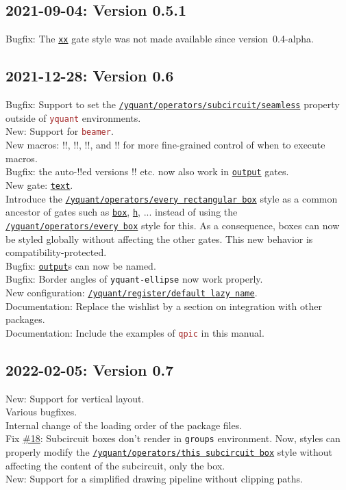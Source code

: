\documentclass{scrartcl}
\def\pkg#1{\textcolor{brown}{\texttt{#1}}}
\def\gate#1{\hyperref[gate:#1]{\texttt{#1}}}
\def\style#1{\hyperref[style:#1]{\texttt{#1}}}
\def\Yquant{\pkg{yquant}}
\begin{document}
      \subsection*{2021-09-04: Version 0.5.1}
         Bugfix: The \gate{xx} gate style was not made available since version~0.4-alpha.

      \subsection*{2021-12-28: Version 0.6}
         Bugfix: Support to set the \style{/yquant/operators/subcircuit/seamless} property outside of \Yquant{} environments. \\
         New: Support for \pkg{beamer}. \\
         New macros: \tex!\yquantsecondpass!, \tex!\yquantesecondpass!, \tex!\yquantescape!, and \tex!\yquanteescape! for more fine\hyp grained control of when to execute macros. \\
         Bugfix: the auto\hyp\tex!\protect!ed versions \tex!\Ifnum! etc. now also work in \gate{output} gates. \\
         New gate: \gate{text}. \\
         Introduce the \style{/yquant/operators/every rectangular box} style as a common ancestor of gates such as \gate{box}, \gate{h}, ... instead of using the \style{/yquant/operators/every box} style for this.
         As a consequence, boxes can now be styled globally without affecting the other gates.
         This new behavior is compatibility\hyp protected. \\
         Bugfix: \gate{output}s can now be named. \\
         Bugfix: Border angles of \texttt{yquant-ellipse} now work properly. \\
         New configuration: \style{/yquant/register/default lazy name}. \\
         Documentation: Replace the wishlist by a section on integration with other packages. \\
         Documentation: Include the examples of \pkg{qpic} in this manual.

      \subsection*{2022-02-05: Version 0.7}
         New: Support for vertical layout. \\
         Various bugfixes. \\
         Internal change of the loading order of the package files. \\
         Fix \href{https://github.com/projekter/yquant/issues/18}{\#18}: Subcircuit boxes don't render in \texttt{groups} environment.
         Now, styles can properly modify the \style{/yquant/operators/this subcircuit box} style without affecting the content of the subcircuit, only the box. \\
         New: Support for a simplified drawing pipeline without clipping paths.
\end{document}
